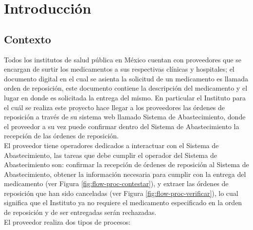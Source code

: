 \chapter{Introducción}\label{cap1}

\section{Contexto} \label{sec:intro-contexto}
Todos los institutos de salud pública en México cuentan con proveedores que se encargan de surtir los medicamentos a sus respectivas clínicas y hospitales; el documento digital en el cual se asienta la solicitud de un medicamento es llamada orden de reposición, este documento contiene la descripción del medicamento y el lugar en donde es solicitada la entrega del mismo. En particular el Instituto para el cuál se realiza este proyecto hace llegar a los proveedores las órdenes de reposición a través de su sistema web llamado Sistema de Abastecimiento, donde el proveedor a su vez puede confirmar dentro del Sistema de Abastecimiento la recepción de las órdenes de reposición.\\
El proveedor tiene operadores dedicados a interactuar con el Sistema de Abastecimiento, las tareas que debe cumplir el operador del Sistema de Abastecimiento son: confirmar la recepción de órdenes de reposición al Sistema de Abastecimiento, obtener la información necesaria para cumplir con la entrega del medicamento (ver Figura \ref{fig:flow-proc-contestar}), y extraer las órdenes de reposición que han sido canceladas (ver Figura \ref{fig:flow-proc-verificar}), lo cual significa que el Instituto ya no requiere el medicamento especificado en la orden de reposición y de ser entregadas serán rechazadas.\\
El proveedor realiza dos tipos de procesos:
